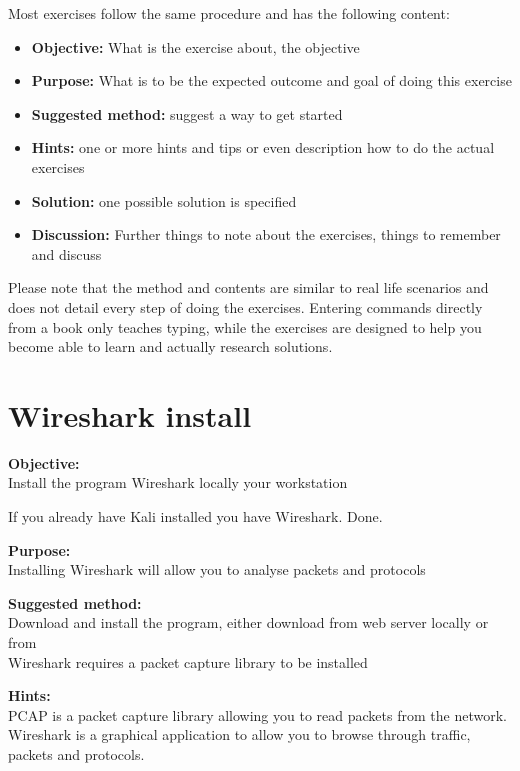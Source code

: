 \documentclass[a4paper,11pt,notitlepage]{report}
\begin{document}
Most exercises follow the same procedure and has the following content:
\begin{itemize}
\item {\bf Objective:} What is the exercise about, the objective
\item {\bf Purpose:} What is to be the expected outcome and goal of doing this exercise
\item {\bf Suggested method:} suggest a way to get started
\item {\bf Hints:} one or more hints and tips or even description how to
do the actual exercises
\item {\bf Solution:} one possible solution is specified
\item {\bf Discussion:} Further things to note about the exercises, things to remember and discuss
\end{itemize}

Please note that the method and contents are similar to real life scenarios and does not detail every step of doing the exercises. Entering commands directly from a book only teaches typing, while the exercises are designed to help you become able to learn and actually research solutions.



\chapter{Wireshark install}
\label{ex:wireshark-install}



{\bf Objective:}\\
Install the program Wireshark locally your workstation

If you already have Kali installed you have Wireshark. Done.

{\bf Purpose:}\\
Installing Wireshark will allow you to analyse packets and protocols

{\bf Suggested method:}\\
Download and install the program, either download from web server locally or from \\
Wireshark requires a packet capture library to be installed

{\bf Hints:}\\
PCAP is a packet capture library allowing you to read packets from the network. Wireshark is a graphical application to allow you to browse through traffic, packets and protocols.
\end{document}
